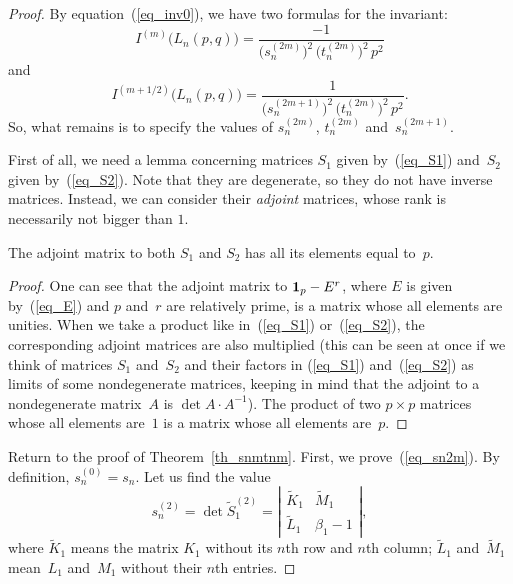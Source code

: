 \documentclass[pdftex]{sigma}
\begin{document}
\begin{proof}
By equation~(\ref{eq_inv0}), we have two formulas for the invariant:
\begin{equation*}
I^{(m)}\bigl(L_n(p,q)\bigr) = \frac{- 1}{\bigl(s_n^{(2m)}\bigr)^2 \, \bigl(t_n^{(2m)}\bigr)^2 \, p^2}
\end{equation*}
and
\begin{equation*}
I^{(m + 1/2)}\bigl(L_n(p,q)\bigr) = \frac{1}{\bigl(s_n^{(2m+1)}\bigr)^2 \, \bigl(t_n^{(2m)}\bigr)^2 \, p^2}. %
\end{equation*}
So, what remains is to specify the values of $s_n^{(2m)}$, $t_n^{(2m)}$ and~$s_n^{(2m+1)}$.

First of all, we need a lemma concerning matrices $S_1$ given by~(\ref{eq_S1}) and~$S_2$ given by~(\ref{eq_S2}). Note that they are degenerate, so they do not have inverse matrices. Instead, we can consider their \emph{adjoint} matrices, whose rank is necessarily not bigger than $1$.

\begin{lemma}
\label{lemma_small}
The adjoint matrix to both $S_1$ and $S_2$ has all its elements equal to~$p$.
\end{lemma}

\begin{proof}
One can see that the adjoint matrix to ${\bf 1}_p-E^r$, where $E$ is given by~(\ref{eq_E}) and $p$ and~$r$ are relatively prime, is a matrix whose all elements are unities. When we take a product like in~(\ref{eq_S1}) or~(\ref{eq_S2}), the corresponding adjoint matrices are also multiplied (this can be seen at once if we think of matrices $S_1$ and~$S_2$ and their factors in (\ref{eq_S1}) and~(\ref{eq_S2}) as limits of some nondegenerate matrices, keeping in mind that the adjoint to a nondegenerate matrix~$A$ is $\det A\cdot A^{-1}$). The product of two $p\times p$ matrices whose all elements are~$1$ is a matrix whose all elements are~$p$.
\end{proof}

Return to the proof of Theorem~\ref{th_snmtnm}. First, we prove~(\ref{eq_sn2m}). By def\/inition, $s_n^{(0)} = s_n$. Let us f\/ind the value
\begin{equation}
s_n^{(2)} = \det \widetilde S_1^{(2)} = \left| \begin{array}{cc} \widetilde K_1 & \widetilde M_1 \\ \widetilde L_1 & \beta_1-1 \end{array} \right|,
\label{eq_small2}
\end{equation}
where $\widetilde K_1$ means the matrix $K_1$ without its $n$th row and $n$th column; $\widetilde L_1$ and~$\widetilde M_1$ mean~$L_1$ and~$M_1$ without
their $n$th entries.


\end{proof}
\end{document}
